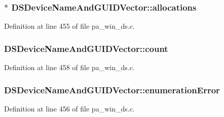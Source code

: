 \subsubsection[{\texorpdfstring{allocations}{allocations}}]{$\ast$ D\+S\+Device\+Name\+And\+G\+U\+I\+D\+Vector\+::allocations}\hypertarget{struct_d_s_device_name_and_g_u_i_d_vector_ab52cdf0ee0b95dd0899d603174fc45f7}{}\label{struct_d_s_device_name_and_g_u_i_d_vector_ab52cdf0ee0b95dd0899d603174fc45f7}


Definition at line 455 of file pa\+\_\+win\+\_\+ds.\+c.

\subsubsection[{\texorpdfstring{count}{count}}]{ D\+S\+Device\+Name\+And\+G\+U\+I\+D\+Vector\+::count}\hypertarget{struct_d_s_device_name_and_g_u_i_d_vector_a80d6776eaa6446da8b8dbe28a5d46eab}{}\label{struct_d_s_device_name_and_g_u_i_d_vector_a80d6776eaa6446da8b8dbe28a5d46eab}


Definition at line 458 of file pa\+\_\+win\+\_\+ds.\+c.

\subsubsection[{\texorpdfstring{enumeration\+Error}{enumerationError}}]{ D\+S\+Device\+Name\+And\+G\+U\+I\+D\+Vector\+::enumeration\+Error}\hypertarget{struct_d_s_device_name_and_g_u_i_d_vector_a4ffdf8a98ae5b9508ea666e48bf0f10a}{}\label{struct_d_s_device_name_and_g_u_i_d_vector_a4ffdf8a98ae5b9508ea666e48bf0f10a}


Definition at line 456 of file pa\+\_\+win\+\_\+ds.\+c.

